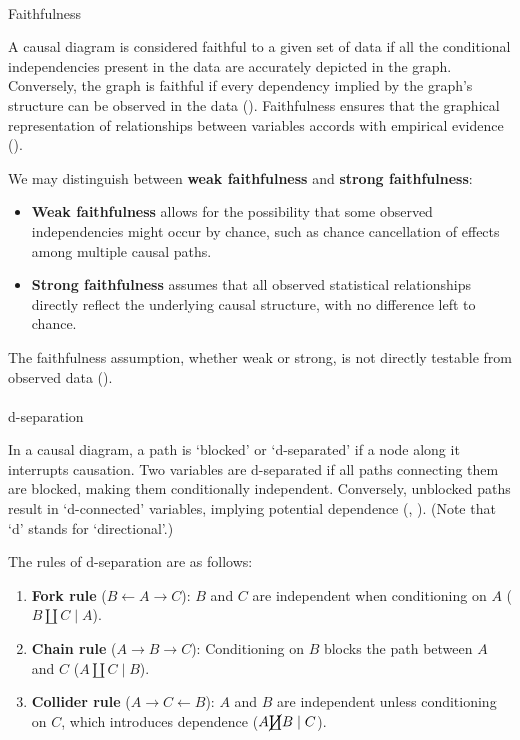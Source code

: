 \documentclass[
  single column]{article}
\makeatletter
\let\oldparagraph\paragraph
\renewcommand{\paragraph}{
    \@ifstar
      \xxxParagraphStar
      \xxxParagraphNoStar
  }
\newcommand{\xxxParagraphStar}[1]{\oldparagraph*{#1}\mbox{}}
\newcommand{\xxxParagraphNoStar}[1]{\oldparagraph{#1}\mbox{}}
\providecommand{\tightlist}{%
  \setlength{\itemsep}{0pt}\setlength{\parskip}{0pt}}\usepackage{longtable,booktabs,array}
\makeatother
\begin{document}
\paragraph{Faithfulness}\label{faithfulness}

A causal diagram is considered faithful to a given set of data if all
the conditional independencies present in the data are accurately
depicted in the graph. Conversely, the graph is faithful if every
dependency implied by the graph's structure can be observed in the data
(). Faithfulness
ensures that the graphical representation of relationships between
variables accords with empirical evidence
().

We may distinguish between \textbf{weak faithfulness} and \textbf{strong
faithfulness}:

\begin{itemize}
\tightlist
\item
  \textbf{Weak faithfulness} allows for the possibility that some
  observed independencies might occur by chance, such as chance
  cancellation of effects among multiple causal paths.
\item
  \textbf{Strong faithfulness} assumes that all observed statistical
  relationships directly reflect the underlying causal structure, with
  no difference left to chance.
\end{itemize}

The faithfulness assumption, whether weak or strong, is not directly
testable from observed data ().

\paragraph{d-separation}\label{d-separation}

In a causal diagram, a path is `blocked' or `d-separated' if a node
along it interrupts causation. Two variables are d-separated if all
paths connecting them are blocked, making them conditionally
independent. Conversely, unblocked paths result in `d-connected'
variables, implying potential dependence
(,
). (Note that `d' stands for
`directional'.)

The rules of d-separation are as follows:

\begin{enumerate}
\def\labelenumi{\arabic{enumi}.}
\tightlist
\item
  \textbf{Fork rule} (\(B \leftarrow \boxed{A} \rightarrow C\)): \(B\)
  and \(C\) are independent when conditioning on \(A\)
  (\(B \coprod C \mid A\)).
\item
  \textbf{Chain rule} (\(A \rightarrow \boxed{B} \rightarrow C\)):
  Conditioning on \(B\) blocks the path between \(A\) and \(C\)
  (\(A \coprod C \mid B\)).
\item
  \textbf{Collider rule} (\(A \rightarrow \boxed{C} \leftarrow B\)):
  \(A\) and \(B\) are independent unless conditioning on \(C\), which
  introduces dependence (\(A \cancel{\coprod} B \mid C\)).
\end{enumerate}
\end{document}

